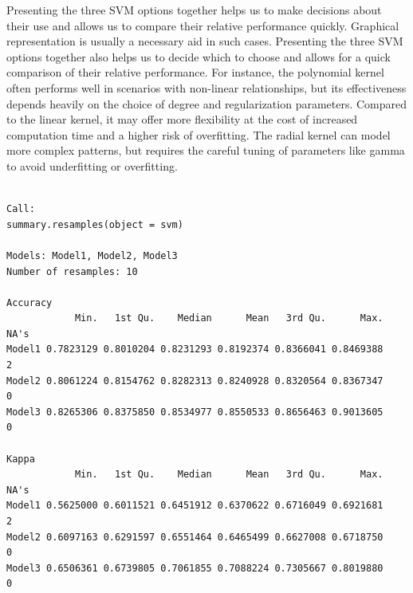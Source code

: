 Presenting the three SVM options together helps us to make decisions about their use and
allows us to compare their relative performance quickly. Graphical
representation is usually a necessary aid in such cases. Presenting the
three SVM options together also helps us to decide which to
choose and allows for a quick comparison of their relative performance. For
instance, the polynomial kernel often performs well in scenarios with
non-linear relationships, but its effectiveness depends heavily on the
choice of degree and regularization parameters. Compared to the linear
kernel, it may offer more flexibility at the cost of increased
computation time and a higher risk of overfitting. The radial kernel can
model more complex patterns, but requires the careful tuning of parameters
like gamma to avoid underfitting or overfitting.

\begin{Shaded}
\begin{Highlighting}[]
\OtherTok{\textless{}{-}} \NormalTok{(}

\end{Highlighting}
\end{Shaded}

\begin{verbatim}

Call:
summary.resamples(object = svm)

Models: Model1, Model2, Model3 
Number of resamples: 10 

Accuracy 
            Min.   1st Qu.    Median      Mean   3rd Qu.      Max. NA's
Model1 0.7823129 0.8010204 0.8231293 0.8192374 0.8366041 0.8469388    2
Model2 0.8061224 0.8154762 0.8282313 0.8240928 0.8320564 0.8367347    0
Model3 0.8265306 0.8375850 0.8534977 0.8550533 0.8656463 0.9013605    0

Kappa 
            Min.   1st Qu.    Median      Mean   3rd Qu.      Max. NA's
Model1 0.5625000 0.6011521 0.6451912 0.6370622 0.6716049 0.6921681    2
Model2 0.6097163 0.6291597 0.6551464 0.6465499 0.6627008 0.6718750    0
Model3 0.6506361 0.6739805 0.7061855 0.7088224 0.7305667 0.8019880    0
\end{verbatim}

\begin{Shaded}
\begin{Highlighting}[]
\end{Highlighting}
\end{Shaded}

